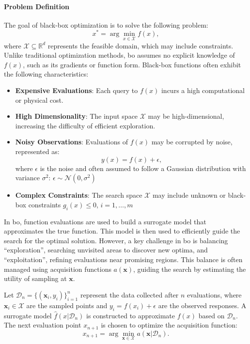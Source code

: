 \paragraph{Problem Definition}

The goal of black-box optimization is to solve the following problem:  
\[
x^* = \arg\min_{x \in \mathcal{X}} f(x),
\]  
where $\mathcal{X} \subseteq \mathbb{R}^d$ represents the feasible domain, which may include constraints. Unlike traditional optimization methods, \ac{bo} assumes no explicit knowledge of \( f(x) \), such as its gradients or function form.  Black-box functions often exhibit the following characteristics:  
\begin{itemize}
    \item \textbf{Expensive Evaluations}: Each query to \( f(x) \) incurs a high computational or physical cost. 
    \item \textbf{High Dimensionality}: The input space \( \mathcal{X} \) may be high-dimensional, increasing the difficulty of efficient exploration. 
    \item \textbf{Noisy Observations}: Evaluations of \( f(x) \) may be corrupted by noise, represented as:  
   \[
   y(x) = f(x) + \epsilon,
   \]  
   where $\epsilon$ is the noise and often assumed to follow a Gaussian distribution with variance $\sigma^2$: $\epsilon \sim \mathcal{N}(0, \sigma^2)$
\item \textbf{Complex Constraints}: The search space \( \mathcal{X} \) may include unknown or black-box constraints \( g_i(x) \leq 0 \), \( i = 1, \dots, m \)
\end{itemize}


In \ac{bo}, function evaluations are used to build a surrogate model that approximates the true function. This model is then used to efficiently guide the search for the optimal solution. However, a key challenge in \ac{bo} is balancing ``exploration'', searching unvisited areas to discover new optima, and ``exploitation'', refining evaluations near promising regions. This balance is often managed using acquisition functions \( a(\mathbf{x}) \), guiding the search by estimating the utility of sampling at \( \mathbf{x} \).  


Let \( \mathcal{D}_n = \{(\mathbf{x}_i, y_i)\}_{i=1}^n \) represent the data collected after \( n \) evaluations, where \( \mathbf{x}_i \in \mathcal{X} \) are the sampled points and \( y_i = f(x_i) + \epsilon \) are the observed responses. A surrogate model \( \hat{f}(x  \vert  \mathcal{D}_n) \) is constructed to approximate \( f(x) \) based on \( \mathcal{D}_n \). The next evaluation point \( x_{n+1} \) is chosen to optimize the acquisition function:  
\[
x_{n+1} = \arg\min_{\mathbf{x} \in \mathcal{X}} a(\mathbf{x} \vert \mathcal{D}_n).
\]  

